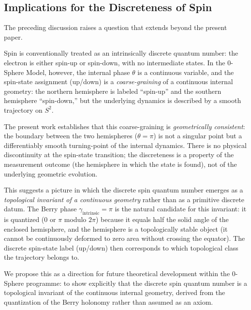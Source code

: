 \documentclass[%
 reprint,
 amsmath,amssymb,
 aps,
 prb,
]{revtex4-2}
\numberwithin{equation}{section}
\theoremstyle{definition}
\theoremstyle{remark}
\begin{document}
\subsection{Implications for the Discreteness of Spin}

The preceding discussion raises a question that extends beyond the present paper.

Spin is conventionally treated as an intrinsically discrete quantum number: the electron is either spin-up or spin-down, with no intermediate states. In the 0-Sphere Model, however, the internal phase $\theta$ is a continuous variable, and the spin-state assignment (up/down) is a \emph{coarse-graining} of a continuous internal geometry: the northern hemisphere is labeled ``spin-up'' and the southern hemisphere ``spin-down,'' but the underlying dynamics is described by a smooth trajectory on $S^2$.

The present work establishes that this coarse-graining is \emph{geometrically consistent}: the boundary between the two hemispheres ($\theta = \pi$) is not a singular point but a differentiably smooth turning-point of the internal dynamics. There is no physical discontinuity at the spin-state transition; the discreteness is a property of the measurement outcome (the hemisphere in which the state is found), not of the underlying geometric evolution.

This suggests a picture in which the discrete spin quantum number emerges as a \emph{topological invariant of a continuous geometry} rather than as a primitive discrete datum. The Berry phase $\gamma_{\text{intrinsic}} = \pi$ is the natural candidate for this invariant: it is quantized ($0$ or $\pi$ modulo $2\pi$) because it equals half the solid angle of the enclosed hemisphere, and the hemisphere is a topologically stable object (it cannot be continuously deformed to zero area without crossing the equator). The discrete spin-state label (up/down) then corresponds to which topological class the trajectory belongs to.

We propose this as a direction for future theoretical development within the 0-Sphere programme: to show explicitly that the discrete spin quantum number is a topological invariant of the continuous internal geometry, derived from the quantization of the Berry holonomy rather than assumed as an axiom.


\end{document}
